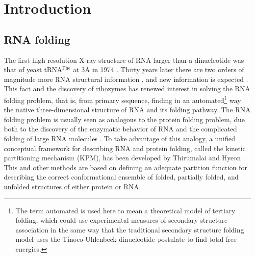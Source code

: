 \chapter{Introduction}
\label{introduction} 

\section{RNA folding}
The first  high resolution X-ray structure  of RNA larger
than a dinucleotide was  that of yeast tRNA$^{\textrm{Phe}}$ at 3{\AA}
in 1974 \cite{robertus1974, kim1974}. Thirty years later there are two
orders of magnitude more RNA structural information \cite{noller2005},
and new  information is  expected \cite{weinberg2009}.  This  fact and
the discovery  of ribozymes \cite{kruger1982,  takada1983} has renewed
interest in  solving the RNA folding problem, that
is, from  primary sequence, finding in  an automated\footnote{The term
  automated  is used  here to  mean  a theoretical  model of  tertiary
  folding,  which   could  use  experimental   measures  of  secondary
  structure association in the same way that the traditional secondary
  structure  folding  model  \cite{zuker1989, hofacker1994}  uses  the
  Tinoco-Uhlenbeck  dinucleotide  postulate  \cite{borer1974} to  find
  total free energies.} way  the native three-dimensional structure of
RNA  and  its  folding  pathway. The  RNA  folding
problem is usually  seen as analogous to the  protein folding problem,
due  both  to   the  discovery  of  the  enzymatic   behavior  of  RNA
\cite{kruger1982, takada1983} and the complicated folding of large RNA
molecules  \cite{batey1999}.  To  take  advantage of  this analogy,  a
unified conceptual  framework for describing RNA  and protein folding,
called the kinetic partitioning mechanism (KPM), has been developed by
Thirumalai and Hyeon \cite{thirumalai2005}. This and other methods are
based on  defining an adequate  partition function for  describing the
correct  conformational  ensemble  of  folded, partially  folded,  and
unfolded  structures   \cite{chen1995,  chen1998,  thirumalai1996}  of
either protein or RNA.

